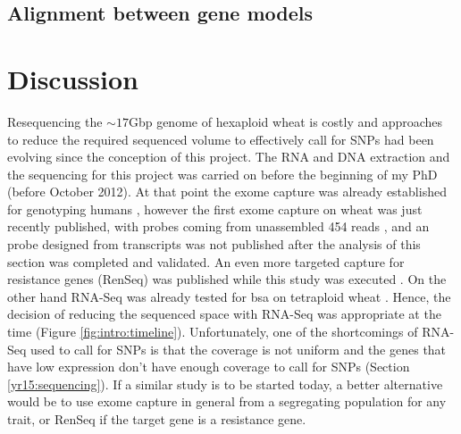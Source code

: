 \subsection{Alignment between gene models}

\section{Discussion} 

Resequencing the $\sim17$Gbp genome of hexaploid wheat is costly and approaches to reduce the required sequenced volume to effectively call for SNPs had been evolving since the conception of this project. 
The RNA and DNA extraction and the sequencing for this project was carried on before the beginning of my PhD (before October 2012). 
At that point the exome capture was already established for genotyping humans \citep{Ng2009}, however the first exome capture on wheat was just recently published, with probes coming from unassembled 454 reads \citep{Winfield2012}, and an probe designed from transcripts \citep{Henry2014} was not published after the analysis of this section was completed and validated.
An even more targeted capture for resistance genes (RenSeq) was published while this study was executed \citep{Jupe2013}.
On the other hand RNA-Seq was already tested for \acrlong{bsa} on tetraploid wheat \citep{Trick2012}.  
Hence, the decision of reducing the sequenced space with RNA-Seq was appropriate at the time (Figure \ref{fig:intro:timeline}). 
Unfortunately, one of the shortcomings of RNA-Seq used to call for SNPs is that the coverage is not uniform and the genes that have low expression don't have enough coverage to call for SNPs (Section  \ref{yr15:sequencing}).
If a similar study is to be started today, a better alternative would be to use exome capture in general from a segregating population for any trait, or RenSeq if the target gene is a resistance gene.  

